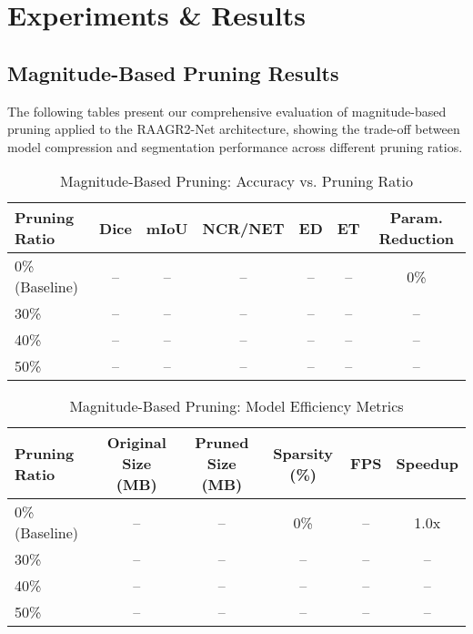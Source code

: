 \documentclass[12pt,a4paper]{article}
\begin{document}
\section{Experiments \& Results}

\subsection{Magnitude-Based Pruning Results}
The following tables present our comprehensive evaluation of magnitude-based pruning applied to the RAAGR2-Net architecture, showing the trade-off between model compression and segmentation performance across different pruning ratios.

\begin{table}[htbp]
\centering
\caption{Magnitude-Based Pruning: Accuracy vs. Pruning Ratio}
\label{tab:magnitude_pruning_results}
\begin{adjustbox}{width=\textwidth,center}
\begin{tabular}{lcccccc}
\toprule
\textbf{Pruning Ratio} & \textbf{Dice} & \textbf{mIoU} & \textbf{NCR/NET} & \textbf{ED} & \textbf{ET} & \textbf{Param. Reduction} \\
\midrule
0\% (Baseline) & -- & -- & -- & -- & -- & 0\% \\
30\% & -- & -- & -- & -- & -- & -- \\
40\% & -- & -- & -- & -- & -- & -- \\
50\% & -- & -- & -- & -- & -- & -- \\
\bottomrule
\end{tabular}
\end{adjustbox}
\end{table}

\begin{table}[htbp]
\centering
\caption{Magnitude-Based Pruning: Model Efficiency Metrics}
\label{tab:magnitude_efficiency}
\begin{adjustbox}{width=\textwidth,center}
\begin{tabular}{lccccc}
\toprule
\textbf{Pruning Ratio} & \textbf{Original Size (MB)} & \textbf{Pruned Size (MB)} & \textbf{Sparsity (\%)} & \textbf{FPS} & \textbf{Speedup} \\
\midrule
0\% (Baseline) & -- & -- & 0\% & -- & 1.0x \\
30\% & -- & -- & -- & -- & -- \\
40\% & -- & -- & -- & -- & -- \\
50\% & -- & -- & -- & -- & -- \\
\bottomrule
\end{tabular}
\end{adjustbox}
\end{table}
\end{document}
